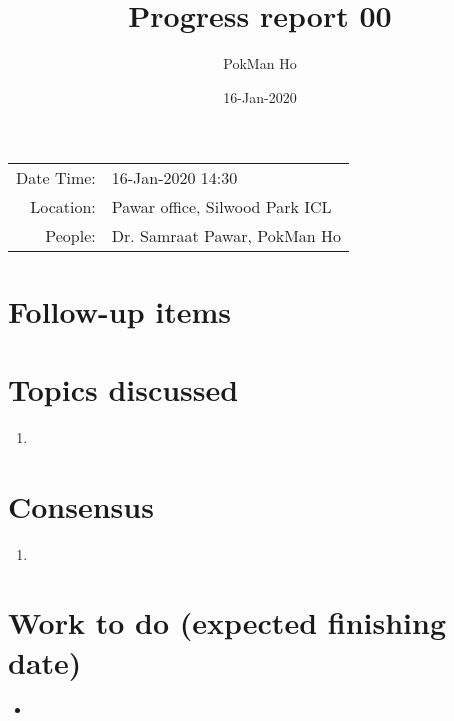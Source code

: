 \documentclass[a4paper,11pt]{article}
\title{Progress report 00}
\author{PokMan Ho}
\date{16-Jan-2020}
\begin{document}
    \maketitle
    
    \begin{tabular}{rl}
        Date Time: & 16-Jan-2020 14:30 \\
        Location: & Pawar office, Silwood Park ICL \\
        People: & Dr. Samraat Pawar, PokMan Ho \\
    \end{tabular}
    \section{Follow-up items}
    \section{Topics discussed}
    \begin{enumerate}
        \item 
    \end{enumerate}
    \section{Consensus}
    \begin{enumerate}
        \item 
    \end{enumerate}
    \section{Work to do (expected finishing date)}
    \begin{itemize}
        \item 
    \end{itemize}
\end{document}
